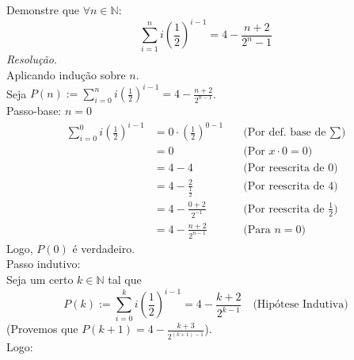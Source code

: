 Demonstre que $\forall n \in \mathbb{N}$:
\begin{displaymath}
	\sum\limits_{i = 1}^n i(\frac{1}{2})^{i - 1} = 4 - \frac{n + 2}{2^n - 1}
\end{displaymath}
\emph{Resolução}. \\
Aplicando indução sobre $n$. \\
Seja $P(n) := \sum\limits_{i = 0}^n i(\frac{1}{2})^{i - 1} = 4 - \frac{n + 2}{2^{n - 1}}$. \\
Passo-base: $n = 0$
\begin{align*}
	\sum\limits_{i = 0}^0 i(\frac{1}{2})^{i - 1} & = 0 \cdot (\frac{1}{2})^{0 - 1} & \quad \text{(Por def. base de $\sum$)}        \\
	                                             & = 0                             & \quad \text{(Por $x \cdot 0 = 0$)}            \\
	                                             & = 4 - 4                         & \quad \text{(Por reescrita de 0)}             \\
	                                             & = 4 - \frac{2}{\frac{1}{2}}     & \quad \text{(Por reescrita de 4)}             \\
	                                             & = 4 - \frac{0 + 2}{2^{-1}}      & \quad \text{(Por reescrita de $\frac{1}{2}$)} \\
	                                             & = 4 - \frac{n + 2}{2^{n - 1}}   & \quad \text{(Para $n = 0$)}
\end{align*}
Logo, $P(0)$ é verdadeiro. \\
Passo indutivo: \\
Seja um certo $k \in \mathbb{N}$ tal que
\begin{displaymath}
	P(k) := \sum\limits_{i = 0}^k i(\frac{1}{2})^{i - 1} = 4 - \frac{k + 2}{2^{k - 1}} \quad \text{(Hipótese Indutiva)}
\end{displaymath}
(Provemos que $P(k + 1) = 4 - \frac{k + 3}{2^{(k + 1) - 1}}$). \\
Logo:

